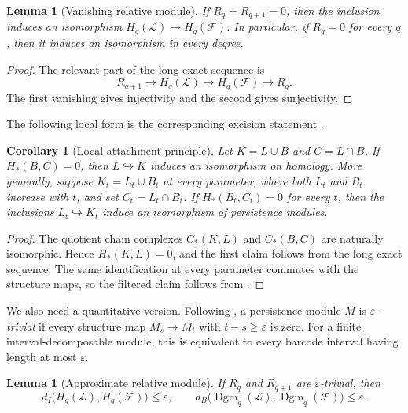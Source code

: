 \documentclass[11pt,letterpaper]{article}
\newtheorem{lemma}[theorem]{Lemma}
\newtheorem{corollary}[theorem]{Corollary}
\theoremstyle{definition}
\newcommand{\Dgm}{\operatorname{Dgm}}
\newcommand{\eps}{\varepsilon}
\begin{document}
\begin{lemma}[Vanishing relative module]
\label{lem:zero-relative-module}
If $R_q=R_{q+1}=0$, then the inclusion induces an isomorphism
$H_q(\mathcal L)\to H_q(\mathcal F)$. In particular, if $R_q=0$ for every
$q$, then it induces an isomorphism in every degree.
\end{lemma}

\begin{proof}
The relevant part of the long exact sequence is
$$
R_{q+1}\longrightarrow H_q(\mathcal L)
\longrightarrow H_q(\mathcal F)\longrightarrow R_q.
$$
The first vanishing gives injectivity and the second gives surjectivity.
\end{proof}

The following local form is the corresponding excision statement
\cite[Section~IV.3]{EdelsbrunnerHarer2010}.

\begin{corollary}[Local attachment principle]
\label{lem:local-attachment-principle}
Let $K=L\cup B$ and $C=L\cap B$. If $H_*(B,C)=0$, then
$L\hookrightarrow K$ induces an isomorphism on homology. More generally,
suppose $K_t=L_t\cup B_t$ at every parameter, where both $L_t$ and $B_t$
increase with $t$, and set $C_t=L_t\cap B_t$. If
$H_*(B_t,C_t)=0$ for every $t$, then the inclusions
$L_t\hookrightarrow K_t$ induce an isomorphism of persistence modules.
\end{corollary}

\begin{proof}
The quotient chain complexes $C_*(K,L)$ and $C_*(B,C)$ are naturally
isomorphic. Hence $H_*(K,L)=0$, and the first claim follows from the long
exact sequence. The same identification at every parameter commutes with the
structure maps, so the filtered claim follows from
.
\end{proof}

We also need a quantitative version. Following
\cite[Section~6]{BauerLesnick2015}, a persistence module $M$ is
\emph{$\eps$-trivial} if every structure map $M_s\to M_t$ with
$t-s\geq\eps$ is zero. For a finite interval-decomposable module, this is
equivalent to every barcode interval having length at most $\eps$.

\begin{lemma}[Approximate relative module]
\label{lem:approx-relative-module}
If $R_q$ and $R_{q+1}$ are $\eps$-trivial, then
$$
d_I\bigl(H_q(\mathcal L),H_q(\mathcal F)\bigr)\leq\eps,
\qquad
d_B\bigl(\Dgm_q(\mathcal L),\Dgm_q(\mathcal F)\bigr)\leq\eps.
$$
\end{lemma}
\end{document}
